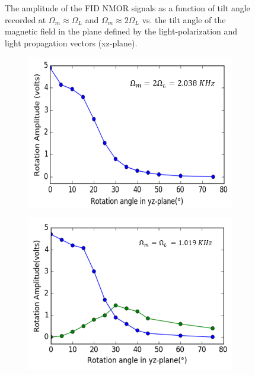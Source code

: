 \begin{figure}
\begin{subfigure}[b]{0.45\textwidth}
        \caption{}
        \label{fig:three sin x}
    \end{subfigure}
    \caption{ The amplitude of the FID NMOR signals as a function of
      tilt angle recorded at $\Omega_m\approx\Omega_L$ and
      $\Omega_m\approx 2\Omega_L$ vs. the tilt angle of the magnetic
      field in the plane defined by the light-polarization and light
      propagation vectors (xz-plane). \label{fig:tilted-wrong}}
\end{figure}

\begin{figure}
    \centering
   \begin{subfigure}[b]{0.45\textwidth}
        \includegraphics[width=\textwidth]{figures/tilt_y_larmor.png}
        \caption{}
        \label{fig:tilt_y}
    \end{subfigure}
    \hfill
     \begin{subfigure}[b]{0.45\textwidth}
        \centering
        \includegraphics[width=\textwidth]{figures/tilt_y_2larmor.png}

\end{subfigure}
\end{figure}
